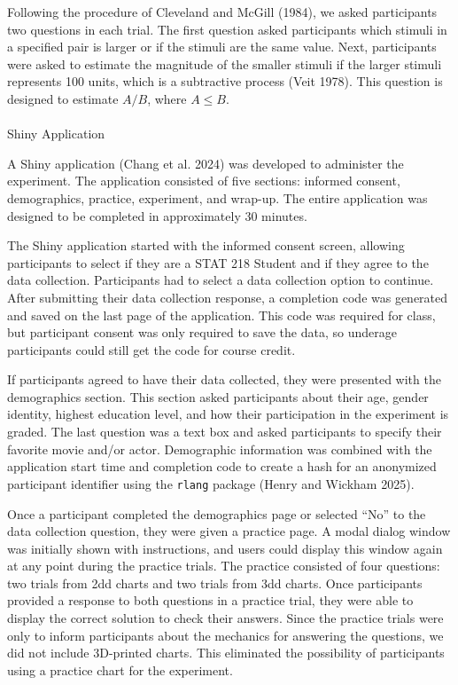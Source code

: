 \documentclass[
  letterpaper,
  DIV=11,
  numbers=noendperiod]{scrartcl}
\makeatletter
\let\oldparagraph\paragraph
\renewcommand{\paragraph}{
    \@ifstar
      \xxxParagraphStar
      \xxxParagraphNoStar
  }
\newcommand{\xxxParagraphStar}[1]{\oldparagraph*{#1}\mbox{}}
\newcommand{\xxxParagraphNoStar}[1]{\oldparagraph{#1}\mbox{}}
\makeatother
\begin{document}
Following the procedure of Cleveland and McGill (1984), we asked
participants two questions in each trial. The first question asked
participants which stimuli in a specified pair is larger or if the
stimuli are the same value. Next, participants were asked to estimate
the magnitude of the smaller stimuli if the larger stimuli represents
100 units, which is a subtractive process (Veit 1978). This question is
designed to estimate \(A/B\), where \(A\leq B\).

\paragraph{Shiny Application}\label{shiny-application}

A Shiny application (Chang et al. 2024) was developed to administer the
experiment. The application consisted of five sections: informed
consent, demographics, practice, experiment, and wrap-up. The entire
application was designed to be completed in approximately 30 minutes.

The Shiny application started with the informed consent screen, allowing
participants to select if they are a STAT 218 Student and if they agree
to the data collection. Participants had to select a data collection
option to continue. After submitting their data collection response, a
completion code was generated and saved on the last page of the
application. This code was required for class, but participant consent
was only required to save the data, so underage participants could still
get the code for course credit.

If participants agreed to have their data collected, they were presented
with the demographics section. This section asked participants about
their age, gender identity, highest education level, and how their
participation in the experiment is graded. The last question was a text
box and asked participants to specify their favorite movie and/or actor.
Demographic information was combined with the application start time and
completion code to create a hash for an anonymized participant
identifier using the \texttt{rlang} package (Henry and Wickham 2025).

Once a participant completed the demographics page or selected ``No'' to
the data collection question, they were given a practice page. A modal
dialog window was initially shown with instructions, and users could
display this window again at any point during the practice trials. The
practice consisted of four questions: two trials from 2dd charts and two
trials from 3dd charts. Once participants provided a response to both
questions in a practice trial, they were able to display the correct
solution to check their answers. Since the practice trials were only to
inform participants about the mechanics for answering the questions, we
did not include 3D-printed charts. This eliminated the possibility of
participants using a practice chart for the experiment.
\end{document}
